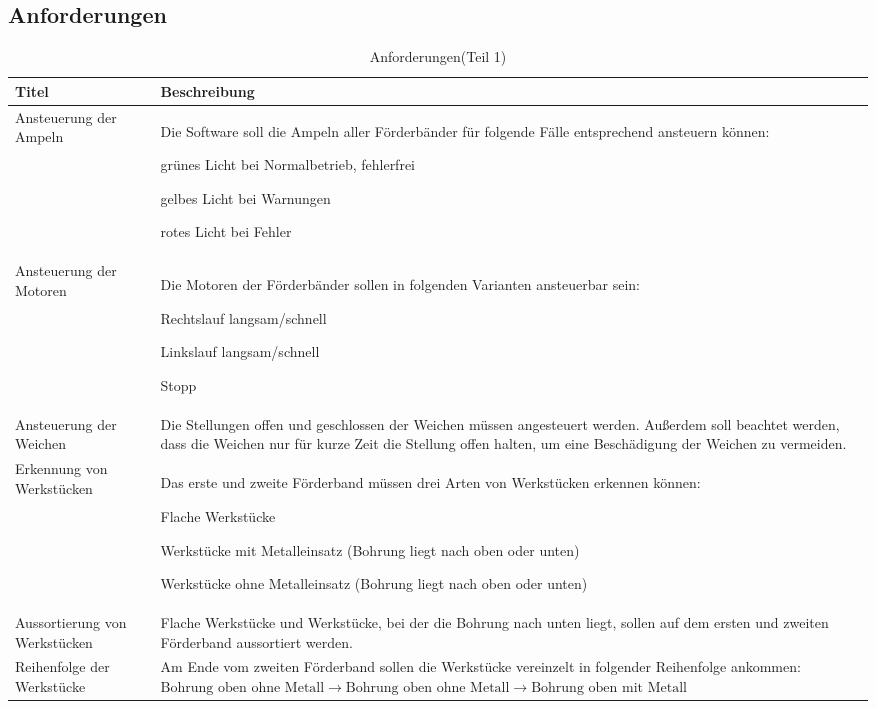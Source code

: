 \documentclass[a4paper, 11pt]{article}
\newcommand{\su}{\glqq} %
\newcommand{\so}{\grqq\xspace} %
\begin{document}
\newpage

\subsection{Anforderungen}
\begin{table}[H]
\centering
    \begin{tabularx}{\textwidth}{|X|X|}
    \hline
    \textbf{Titel}&\textbf{Beschreibung}\\
    \hline
    Ansteuerung der Ampeln&Die Software soll die Ampeln aller Förderbänder für folgende Fälle entsprechend ansteuern können:
    \begin{compactenum}[-]
        \item grünes Licht bei Normalbetrieb, fehlerfrei 
        \item gelbes Licht bei Warnungen 
        \item rotes Licht bei Fehler 
    \end{compactenum}\\
    \hline
    Ansteuerung der Motoren&Die Motoren der Förderbänder sollen in folgenden Varianten ansteuerbar sein: 
    \begin{compactenum}[-]
        \item Rechtslauf langsam/schnell
        \item Linkslauf langsam/schnell
        \item Stopp
    \end{compactenum}\\
    \hline
    Ansteuerung der Weichen&Die Stellungen \su offen\so und \su geschlossen\so der Weichen müssen angesteuert werden. Außerdem soll beachtet werden, dass die Weichen nur für kurze Zeit die Stellung \su offen\so halten, um eine Beschädigung der Weichen zu vermeiden.\\
    \hline
    Erkennung von Werkstücken&Das erste und zweite Förderband müssen drei Arten von Werkstücken erkennen können: 
    \begin{compactenum}[-]
        \item Flache Werkstücke 
        \item Werkstücke mit Metalleinsatz (Bohrung liegt nach oben oder unten) 
        \item Werkstücke ohne Metalleinsatz (Bohrung liegt nach oben oder unten)
    \end{compactenum}\\
    \hline
    Aussortierung von Werkstücken&Flache Werkstücke und Werkstücke, bei der die Bohrung nach unten liegt, sollen auf dem ersten und zweiten Förderband aussortiert werden. \\
    \hline
    Reihenfolge der Werkstücke&Am Ende vom zweiten Förderband sollen die Werkstücke vereinzelt in folgender Reihenfolge ankommen:\hspace{2cm}
$\text{Bohrung oben ohne Metall}\rightarrow \text{Bohrung oben ohne Metall}\rightarrow \text{Bohrung oben mit Metall}$ \\
    \hline
    \end{tabularx}
    \caption{Anforderungen(Teil 1)}
    \label{anf1}
\end{table}
\end{document}
